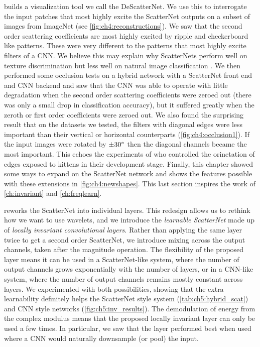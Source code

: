 \textbf{} builds a visualization tool we call the
DeScatterNet. We use this to interrogate the input patches that most highly
excite the ScatterNet outputs on a subset of images from ImageNet (see
\autoref{fig:ch4:reconstructions}). We saw that
the second order scattering coefficients are most highly excited by ripple and
checkerboard like patterns. These were very different to the patterns
that most highly excite filters of a CNN. We believe this may explain why
ScatterNets perform well on texture discrimination \cite{bruna_invariant_2013}
but less well on natural image classification \cite{oyallon_deep_2015}. We then
performed some occlusion tests on a hybrid network with a ScatterNet front end
and CNN backend and saw that the CNN was able to operate with little degradation when the second
order scattering coefficients were zeroed out (there was only a small drop in
classification accuracy), but it suffered greatly when the zeroth or first order
coefficients were zeroed out. We also found the surprising result that on the
datasets we tested, the filters with diagonal edges were less important than their vertical or
horizontal counterparts (\autoref{fig:ch4:occlusion1}). If the input images were
rotated by $\pm 30^{\circ}$ then the diagonal channels became the most important.
This echoes the experiments of
\citeauthor{blakemore_development_1970}\cite{blakemore_development_1970} who
controlled the orinetation of edges exposed to kittens in their development
stage. Finally, this chapter showed some ways to expand on the ScatterNet
network and shows the features possible with these extensions in \autoref{fig:ch4:newshapes}.
This last section inspires the work of \autoref{ch:invariant}
and \autoref{ch:freqlearn}.

\textbf{} reworks the ScatterNet into individual layers.
This redesign allows us to rethink how we want to use wavelets, and we introduce
the \emph{learnable ScatterNet} made up of \emph{locally invariant convolutional
layers}. Rather than applying the same layer twice to get a second order
ScatterNet, we introduce mixing across the output channels, taken after the
magnitude operation. The flexibility of the proposed layer means it can be used
in a ScatterNet-like system, where the number of output channels grows
exponentially with the number of layers, or in a CNN-like system, where the
number of output channels remains mostly constant across layers. We experimented
with both possibilities, showing that the extra learnability definitely helps
the ScatterNet style system (\autoref{tab:ch5:hybrid_scat}) and CNN style
networks (\autoref{fig:ch5:inv_results}). The demodulation of energy from the complex
modulus means that the proposed locally invariant layer can only be used a few
times. In particular, we saw that the layer performed best when used where a CNN
would naturally downsample (or pool) the input.

